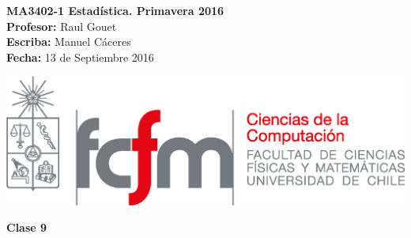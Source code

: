 \documentclass[10pt]{article}
\theoremstyle{plain}
\theoremstyle{definition}
\newcommand{\catnum}{9} %
\newcommand{\fecha}{13 de Septiembre 2016 }
\begin{document}
\vspace*{-1.2 cm}
\begin{minipage}{0.6\textwidth}
\begin{flushleft}
\hspace*{-0.5cm}\textbf{MA3402-1 Estadística. Primavera 2016}\\
\hspace*{-0.5cm}\textbf{Profesor:} Raul Gouet\\
\hspace*{-0.5cm}\textbf{Escriba:} Manuel Cáceres\\
\hspace*{-0.5cm}\textbf{Fecha:} \fecha
\end{flushleft}
\end{minipage}
\begin{minipage}{0.36\textwidth}
\begin{flushright}
\includegraphics[scale=0.3]{imagenes/fcfm_dcc}
\end{flushright}
\end{minipage}
\bigskip

\begin{center}
\LARGE\textbf{Clase \catnum}
\end{center}
\end{document}
